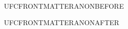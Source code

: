 \documentclass{abntexto-ufc}
\begin{document}
UFCFRONTMATTERANONBEFORE\par
\ufcPrintCover
UFCFRONTMATTERANONAFTER\par
\end{document}
